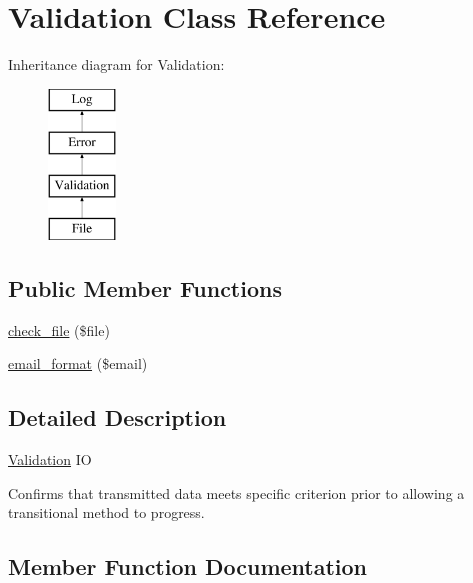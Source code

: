 \hypertarget{class_w_a_f_f_l_e_1_1_framework_1_1_i_o_1_1_validation}{}\section{Validation Class Reference}
\label{class_w_a_f_f_l_e_1_1_framework_1_1_i_o_1_1_validation}
Inheritance diagram for Validation\+:\begin{figure}[H]
\begin{center}
\leavevmode
\includegraphics[height=4.000000cm]{class_w_a_f_f_l_e_1_1_framework_1_1_i_o_1_1_validation}
\end{center}
\end{figure}
\subsection*{Public Member Functions}
\begin{DoxyCompactItemize}
\item 
\hyperlink{class_w_a_f_f_l_e_1_1_framework_1_1_i_o_1_1_validation_a4ff84cc981fb60ee42f19420441e8d7b}{check\+\_\+file} (\$file)
\item 
\hyperlink{class_w_a_f_f_l_e_1_1_framework_1_1_i_o_1_1_validation_a93629f2b411f25d13fac77a36470fbae}{email\+\_\+format} (\$email)
\end{DoxyCompactItemize}


\subsection{Detailed Description}
\hyperlink{class_w_a_f_f_l_e_1_1_framework_1_1_i_o_1_1_validation}{Validation} IO

Confirms that transmitted data meets specific criterion prior to allowing a transitional method to progress. 

\subsection{Member Function Documentation}
\mbox{\label{class_w_a_f_f_l_e_1_1_framework_1_1_i_o_1_1_validation_a4ff84cc981fb60ee42f19420441e8d7b}} 
